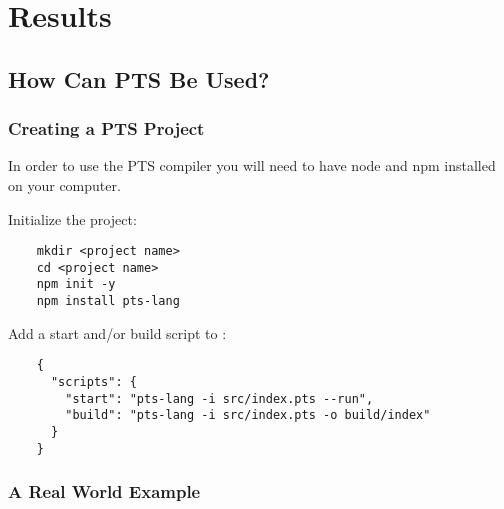 \chapter{Results}\label{ch:results}

\section{How Can PTS Be Used?}\label{sec:how-can-this-be-used?}

\subsection{Creating a PTS Project}\label{subsec:creating-a-pts-project}

In order to use the PTS compiler you will need to have node and npm installed on your computer.

Initialize the project:

\begin{verbatim}
    mkdir <project name>
    cd <project name>
    npm init -y
    npm install pts-lang
\end{verbatim}

Add a start and/or build script to :

\begin{verbatim}
    {
      "scripts": {
        "start": "pts-lang -i src/index.pts --run",
        "build": "pts-lang -i src/index.pts -o build/index"
      }
    }
\end{verbatim}

\subsection{A Real World Example}\label{subsec:a-real-world-example}


